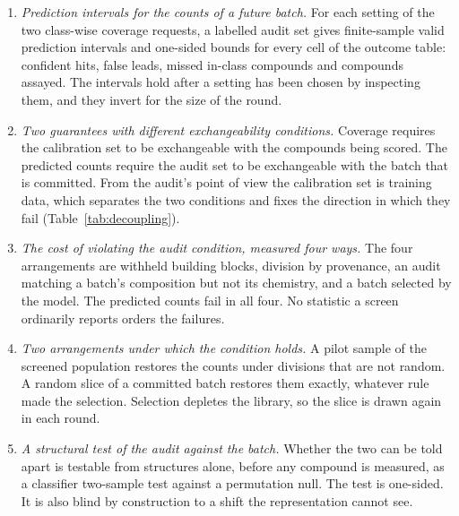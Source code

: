 \documentclass[twocolumn,10pt]{article}
\begin{document}
\begin{enumerate}\itemsep2pt
\item \emph{Prediction intervals for the counts of a future batch.} For each setting of the two
class-wise coverage requests, a labelled audit set gives finite-sample valid prediction intervals
and one-sided bounds for every cell of the outcome table: confident hits, false leads, missed
in-class compounds and compounds assayed. The intervals hold after a setting has been chosen by
inspecting them, and they invert for the size of the
round.\citep{Thatcher1964,Meeker2017Intervals}
\item \emph{Two guarantees with different exchangeability conditions.} Coverage requires the
calibration set to be exchangeable with the compounds being scored. The predicted counts require
the audit set to be exchangeable with the batch that is committed. From the audit's point of
view the calibration set is training data, which separates the two conditions and fixes the
direction in which they fail (Table~\ref{tab:decoupling}).
\item \emph{The cost of violating the audit condition, measured four ways.} The four
arrangements are withheld building blocks, division by provenance, an audit matching a batch's
composition but not its chemistry, and a batch selected by the model. The predicted counts fail
in all four. No statistic a screen ordinarily reports orders the failures.
\item \emph{Two arrangements under which the condition holds.} A pilot sample of the screened
population restores the counts under divisions that are not random. A random slice of a
committed batch restores them exactly, whatever rule made the selection. Selection depletes the
library, so the slice is drawn again in each round.
\item \emph{A structural test of the audit against the batch.} Whether the two can be told apart
is testable from structures alone, before any compound is measured, as a classifier two-sample
test against a permutation null.\citep{LopezPaz2017Revisiting} The test is one-sided. It is also
blind by construction to a shift the representation cannot see.
\end{enumerate}
\end{document}
